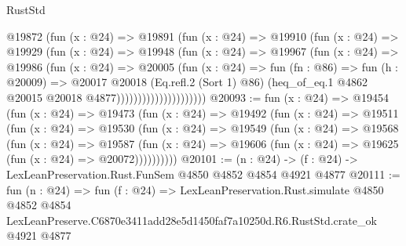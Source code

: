 \begin{lexlean}{RustStd}
\begin{coremodule}
                          @19872
                            (fun (x : @24) =>
                            @19891
                              (fun (x : @24) =>
                              @19910
                                (fun (x : @24) =>
                                @19929
                                  (fun (x : @24) =>
                                  @19948
                                    (fun (x : @24) =>
                                    @19967
                                      (fun (x : @24) =>
                                      @19986
                                        (fun (x : @24) =>
                                        @20005
                                          (fun (x : @24) =>
                                          fun (fn : @86) =>
                                          fun (h : @20009) =>
                                          @20017
                                            @20018
                                            (Eq.refl.{2} (Sort 1) @86)
                                            (heq_of_eq.{1}
                                              @4862
                                              @20015
                                              @20018
                                              @4877)))))))))))))))))))))
@20093 := fun (x : @24) =>
  @19454
    (fun (x : @24) =>
    @19473
      (fun (x : @24) =>
      @19492
        (fun (x : @24) =>
        @19511
          (fun (x : @24) =>
          @19530
            (fun (x : @24) =>
            @19549
              (fun (x : @24) =>
              @19568
                (fun (x : @24) =>
                @19587
                  (fun (x : @24) =>
                  @19606 (fun (x : @24) => @19625 (fun (x : @24) => @20072))))))))))
@20101 := (n : @24) -> (f : @24) -> LexLeanPreservation.Rust.FunSem @4850 @4852 @4854 @4921 @4877
@20111 := fun (n : @24) =>
  fun (f : @24) =>
  LexLeanPreservation.Rust.simulate
    @4850
    @4852
    @4854
    LexLeanPreserve.C6870e3411add28e5d1450faf7a10250d.R6.RustStd.crate_ok
    @4921
    @4877
\end{coremodule}
\end{lexlean}
